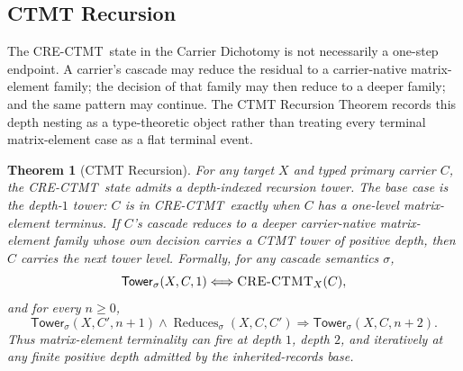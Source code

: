 \documentclass[11pt]{article}
\newcommand{\CRECTMT}{\textsc{CRE-CTMT}}
\newtheorem{theorem}{Theorem}[section]
\theoremstyle{definition}
\begin{document}
\subsection{CTMT Recursion}\label{sec:foreclosure:ctmt-recursion}

The \CRECTMT\ state in the Carrier Dichotomy is not necessarily a
one-step endpoint.  A carrier's cascade may reduce the residual to a
carrier-native matrix-element family; the decision of that family may
then reduce to a deeper family; and the same pattern may continue.  The
CTMT Recursion Theorem records this depth nesting as a type-theoretic
object rather than treating every terminal matrix-element case as a
flat terminal event.

\begin{theorem}[CTMT Recursion]\label{thm:ctmt-recursion}
For any target \(X\) and typed primary carrier \(C\), the
\CRECTMT\ state admits a depth-indexed recursion tower.  The base case
is the depth-\(1\) tower: \(C\) is in \CRECTMT\ exactly when \(C\) has
a one-level matrix-element terminus.  If \(C\)'s cascade reduces to a
deeper carrier-native matrix-element family whose own decision carries
a CTMT tower of positive depth, then \(C\) carries the next tower
level.  Formally, for any cascade semantics \(\sigma\),
\[
  \mathsf{Tower}_{\sigma}(X,C,1)
  \Longleftrightarrow
  \mbox{\CRECTMT}_X(C),
\]
and for every \(n\geq 0\),
\[
  \mathsf{Tower}_{\sigma}(X,C',n+1)\wedge
  \operatorname{Reduces}_{\sigma}(X,C,C')
  \Longrightarrow
  \mathsf{Tower}_{\sigma}(X,C,n+2).
\]
Thus matrix-element terminality can fire at depth \(1\), depth \(2\),
and iteratively at any finite positive depth admitted by the
inherited-records base.
\end{theorem}
\end{document}
